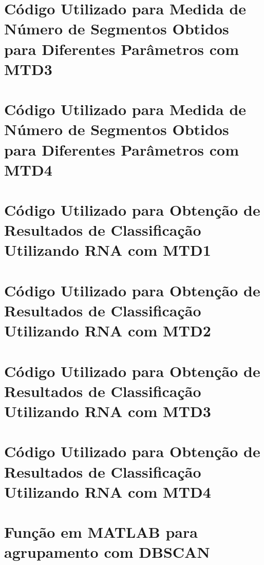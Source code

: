 \begin{apendicesenv}
\chapter{Código Utilizado para Medida de Número de Segmentos Obtidos para Diferentes Parâmetros com MTD3}

\label{ap:num_mtd3}
\chapter{Código Utilizado para Medida de Número de Segmentos Obtidos para Diferentes Parâmetros com MTD4}
%
\label{ap:num_mtd4}
\chapter{Código Utilizado para Obtenção de Resultados de Classificação Utilizando RNA com MTD1}

\label{ap:rna_mtd1}
\chapter{Código Utilizado para Obtenção de Resultados de Classificação Utilizando RNA com MTD2}

\label{ap:rna_mtd2}
\chapter{Código Utilizado para Obtenção de Resultados de Classificação Utilizando RNA com MTD3}

\label{ap:rna_mtd3}
\chapter{Código Utilizado para Obtenção de Resultados de Classificação Utilizando RNA com MTD4}
%
\label{ap:rna_mtd4}
\chapter{Função em MATLAB para agrupamento com DBSCAN}
\label{ap:dbscan}


\end{apendicesenv}
